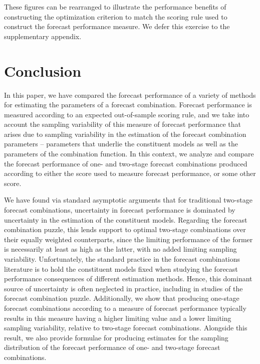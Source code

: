 \documentclass[12pt]{article}
\theoremstyle{definition}
\theoremstyle{remark}
\begin{document}
These figures can be rearranged to illustrate the performance benefits of constructing the optimization criterion to match the scoring rule used to construct the forecast performance measure. We defer this exercise to the supplementary appendix.

\section{Conclusion\label{sec:conclusion}}

In this paper, we have compared the forecast performance of a variety of methods for estimating the parameters of a forecast combination. Forecast performance is measured according to an expected out-of-sample scoring rule, and we take into account the sampling variability of this measure of forecast performance that arises due to sampling variability in the estimation of the forecast combination parameters -- parameters that underlie the constituent models as well as the parameters of the combination function. In this context, we analyze and compare the forecast performance of one- and two-stage forecast combinations produced according to either the score used to measure forecast performance, or some other score.

We have found via standard asymptotic arguments that for traditional two-stage forecast combinations, uncertainty in forecast performance is dominated by uncertainty in the estimation of the constituent models. Regarding the forecast combination puzzle, this lends support to optimal two-stage combinations over their equally weighted counterparts, since the limiting performance of the former is necessarily at least as high as the latter, with no added limiting sampling variability. Unfortunately, the standard practice in the forecast combinations literature is to hold the constituent models fixed when studying the forecast performance consequences of different estimation methods. Hence, this dominant source of uncertainty is often neglected in practice, including in studies of the forecast combination puzzle. Additionally, we show that producing one-stage forecast combinations according to a measure of forecast performance typically results in this measure having a higher limiting value and a lower limiting sampling variability, relative to two-stage forecast combinations. Alongside this result, we also provide formulae for producing estimates for the sampling distribution of the forecast performance of one- and two-stage
forecast combinations.
\end{document}
